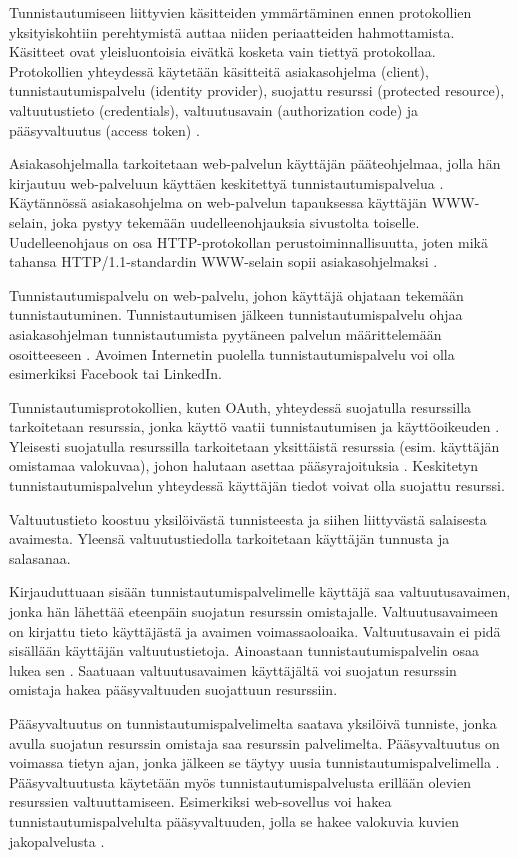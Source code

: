 Tunnistautumiseen liittyvien käsitteiden ymmärtäminen ennen protokollien yksityiskohtiin perehtymistä auttaa niiden periaatteiden hahmottamista. Käsitteet ovat yleisluontoisia eivätkä kosketa vain tiettyä protokollaa. Protokollien yhteydessä käytetään käsitteitä asiakasohjelma (client), tunnistautumispalvelu (identity provider), suojattu resurssi (protected resource), valtuutustieto (credentials), valtuutusavain (authorization code) ja pääsyvaltuutus (access token) \cite{nisti}.

Asiakasohjelmalla tarkoitetaan web-palvelun käyttäjän pääteohjelmaa, jolla hän kirjautuu web-palveluun käyttäen keskitettyä tunnistautumispalvelua \cite{nisti}. Käytännössä asiakasohjelma on web-palvelun tapauksessa käyttäjän WWW-selain, joka pystyy tekemään uudelleenohjauksia sivustolta toiselle. Uudelleenohjaus on osa HTTP-pro\-to\-kol\-lan perustoiminnallisuutta, joten mikä tahansa HTTP/1.1-stan\-dar\-din WWW-\-se\-lain sopii asiakasohjelmaksi \cite{rfc2616}.

Tunnistautumispalvelu on web-palvelu, johon käyttäjä ohjataan tekemään tunnistautuminen. Tunnistautumisen jälkeen tunnistautumispalvelu ohjaa asia\-kas\-oh\-jel\-man tunnistautumista pyytäneen palvelun määrittelemään osoit\-tee\-seen \cite{nisti}. Avoimen Internetin puolella tunnistautumispalvelu voi olla esimerkiksi Facebook tai LinkedIn.

Tunnistautumisprotokollien, kuten OAuth, yhteydessä suojatulla resurssilla tarkoitetaan resurssia, jonka käyttö vaatii tunnistautumisen ja käyttöoikeuden \cite{oauth2_0}. Yleisesti suojatulla resurssilla tarkoitetaan yksittäistä resurssia (esim. käyttäjän omistamaa valokuvaa), johon halutaan asettaa pääsyrajoituksia \cite{nisti}. Keskitetyn tunnistautumispalvelun yhteydessä käyttäjän tiedot voivat olla suojattu resurssi.

Valtuutustieto koostuu yksilöivästä tunnisteesta ja siihen liittyvästä salaisesta avaimesta. Yleensä valtuutustiedolla tarkoitetaan käyttäjän tunnusta ja salasanaa.

Kirjauduttuaan sisään tunnistautumispalvelimelle käyttäjä saa valtuutusavaimen, jonka hän lähettää eteenpäin suojatun resurssin omistajalle. Valtuutusavaimeen on kirjattu tieto käyttäjästä ja avaimen voimassaoloaika. Valtuutusavain ei pidä sisällään käyttäjän valtuutustietoja. Ainoastaan tunnistautumispalvelin osaa lukea sen \cite{nisti}. Saatuaan valtuutusavaimen käyttäjältä voi suojatun resurssin omistaja hakea pääsyvaltuuden suojattuun resurssiin.

Pääsyvaltuutus on tunnistautumispalvelimelta saatava yksilöivä tunniste, jonka avulla suojatun resurssin omistaja saa resurssin palvelimelta. Pääsyvaltuutus on voimassa tietyn ajan, jonka jälkeen se täytyy uusia tunnistautumispalvelimella \cite{nisti}. Pääsyvaltuutusta käytetään myös tunnistautumispalvelusta erillään olevien resurssien valtuuttamiseen. Esimerkiksi web-sovellus voi hakea tunnistautumispalvelulta pääsyvaltuuden, jolla se hakee valokuvia kuvien jakopalvelusta \cite{facebook}.